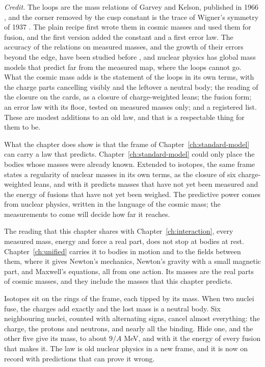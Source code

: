 \emph{Credit.} The loops are the mass relations of Garvey and Kelson, published in 1966 \citep{GarveyKelson1966,Garvey1969}, and the corner removed by the cusp constant is the trace of Wigner's symmetry of 1937 \citep{Wigner1937}. The plain recipe first wrote them in cosmic masses and used them for fusion, and the first version added the constant and a first error law. The accuracy of the relations on measured masses, and the growth of their errors beyond the edge, have been studied before \citep{Barea2005,Morales2009}, and nuclear physics has global mass models that predict far from the measured map, where the loops cannot go. What the cosmic mass adds is the statement of the loops in its own terms, with the charge parts cancelling visibly and the leftover a neutral body; the reading of the closure on the cards, as a closure of charge-weighted leans; the fusion form; an error law with its floor, tested on measured masses only; and a registered list. These are modest additions to an old law, and that is a respectable thing for them to be.

What the chapter does show is that the frame of Chapter~\ref{ch:standard-model} can carry a law that predicts. Chapter~\ref{ch:standard-model} could only place the bodies whose masses were already known. Extended to isotopes, the same frame states a regularity of nuclear masses in its own terms, as the closure of six charge-weighted leans, and with it predicts masses that have not yet been measured and the energy of fusions that have not yet been weighed. The predictive power comes from nuclear physics, written in the language of the cosmic mass; the measurements to come will decide how far it reaches.

The reading that this chapter shares with Chapter~\ref{ch:interaction}, every measured mass, energy and force a real part, does not stop at bodies at rest. Chapter~\ref{ch:unified} carries it to bodies in motion and to the fields between them, where it gives Newton's mechanics, Newton's gravity with a small magnetic part, and Maxwell's equations, all from one action. Its masses are the real parts of cosmic masses, and they include the masses that this chapter predicts.

\begin{plainwords}
Isotopes sit on the rings of the frame, each tipped by its mass. When two nuclei fuse, the charges add exactly and the lost mass is a neutral body. Six neighbouring nuclei, counted with alternating signs, cancel almost everything: the charge, the protons and neutrons, and nearly all the binding. Hide one, and the other five give its mass, to about $9/A$ MeV, and with it the energy of every fusion that makes it. The law is old nuclear physics in a new frame, and it is now on record with predictions that can prove it wrong.
\end{plainwords}
